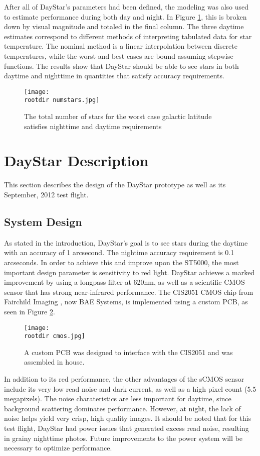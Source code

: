 \documentclass[twocolumn,letterpaper]{IEEEAerospace2012}
\newcommand{\rootdir}{./Figures/}
\begin{document}
After all of DayStar's parameters had been defined, the modeling was also used to estimate performance during both day and night. In Figure \ref{fig:numstars}, this is broken down by visual magnitude and totaled in the final column. The three daytime estimates correspond to different methods of interpreting tabulated data for star temperature. The nominal method is a linear interpolation between discrete temperatures, while the worst and best cases are bound assuming stepwise functions. The results show that DayStar should be able to see stars in both daytime and nighttime in quantities that satisfy accuracy requirements.
\begin{figure}
    \texttt{[image: \\rootdir numstars.jpg]}
    \caption{The total number of stars for the worst case galactic latitude satisfies nighttime and daytime requirements}
    \label{fig:numstars}
\end{figure}

\section{DayStar Description}
This section describes the design of the DayStar prototype as well as its September, 2012 test flight.

\subsection{System Design}
As stated in the introduction, DayStar's goal is to see stars during the daytime with an accuracy of 1 arcsecond. The nightime accuracy requirement is 0.1 arcseconds. In order to achieve this and improve upon the ST5000, the most important design parameter is sensitivity to red light. DayStar achieves a marked improvement by using a longpass filter at 620nm, as well as a scientific CMOS sensor that has strong near-infrared performance. The CIS2051 CMOS chip from Fairchild Imaging \cite{fairchild}, now BAE Systems, is implemented using a custom PCB, as seen in Figure \ref{fig:cmos}.
\begin{figure}[H]
    \texttt{[image: \\rootdir cmos.jpg]}
    \caption{A custom PCB was designed to interface with the CIS2051 and was assembled in house.}
    \label{fig:cmos}
\end{figure}
In addition to its red performance, the other advantages of the sCMOS sensor include its very low read noise and dark current, as well as a high pixel count (5.5 megapixels). The noise charateristics are less important for daytime, since background scattering dominates performance. However, at night, the lack of noise helps yield very crisp, high quality images. It should be noted that for this test flight, DayStar had power issues that generated excess read noise, resulting in grainy nighttime photos. Future improvements to the power system will be necessary to optimize performance.
\end{document}
